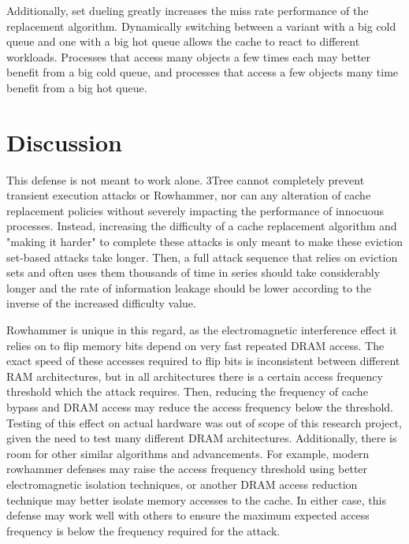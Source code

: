 \documentclass[letterpaper]{article}
\begin{document}
Additionally, set dueling greatly increases the miss rate performance of the replacement algorithm.
Dynamically switching between a variant with a big cold queue and one with a big hot queue
allows the cache to react to different workloads.
Processes that access many objects a few times each may better benefit from a big cold queue,
and processes that access a few objects many time benefit from a big hot queue.



\section{Discussion}

This defense is not meant to work alone.
3Tree cannot completely prevent transient execution attacks or Rowhammer,
nor can any alteration of cache replacement policies
without severely impacting the performance of innocuous processes.
Instead, increasing the difficulty of a cache replacement algorithm
and "making it harder" to complete these attacks
is only meant to make these eviction set-based attacks take longer.
Then, a full attack sequence that relies on eviction sets and often uses them
thousands of time in series \cite{Gofetch} should take considerably longer
and the rate of information leakage should be lower according to the
inverse of the increased difficulty value.

Rowhammer is unique in this regard, as the electromagnetic interference effect
it relies on to flip memory bits depend on very fast repeated DRAM access.
The exact speed of these accesses required to flip bits is inconsistent between
different RAM architectures,
but in all architectures there is a certain access frequency threshold
which the attack requires.
Then, reducing the frequency of cache bypass and DRAM access may reduce the access frequency
below the threshold.
Testing of this effect on actual hardware was out of scope of this research project,
given the need to test many different DRAM architectures.
Additionally, there is room for other similar algorithms and advancements.
For example, modern rowhammer defenses may raise the access frequency threshold
using better electromagnetic isolation techniques,
or another DRAM access reduction technique may better isolate memory accesses to the cache.
In either case, this defense may work well with others
to ensure the maximum expected access frequency is below the frequency required for the attack.
\end{document}
